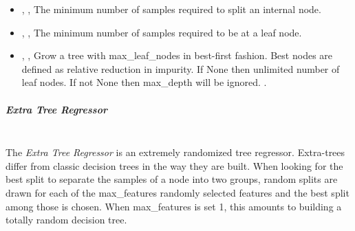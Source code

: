 \begin{itemize}
{      field},
  The maximum depth of the tree.
  If None, then nodes are expanded until all leaves are pure or until all leaves
  contain less than min\_samples\_split samples.
  Ignored if max\_samples\_leaf is not None.
  \item {}, ,
  The minimum number of samples required to split an internal node.
  \item {}, ,
  The minimum number of samples required to be at a leaf node.
  \item {}, ,
  Grow a tree with max\_leaf\_nodes in best-first fashion.
  Best nodes are defined as relative reduction in impurity.
  If None then unlimited number of leaf nodes.
  If not None then max\_depth will be ignored.
  .
\end{itemize}
\subparagraph{Extra Tree Regressor}
\mbox{}
\\The \textit{Extra Tree Regressor} is an extremely randomized tree regressor.
%
Extra-trees differ from classic decision trees in the way they are built.
%
When looking for the best split to separate the samples of a node into two
groups, random splits are drawn for each of the max\_features randomly selected
features and the best split among those is chosen.
%
When max\_features is set 1, this amounts to building a totally random decision
tree.
%
